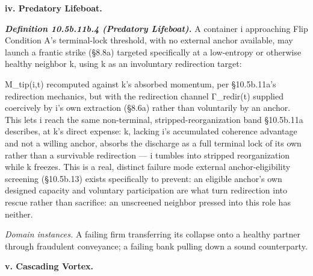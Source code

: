 \documentclass[
]{article}
\begin{document}
\textbf{iv. Predatory Lifeboat.}

\emph{\textbf{Definition 10.5b.11b.4 (Predatory Lifeboat).}} A container
i approaching Flip Condition A's terminal-lock threshold, with no
external anchor available, may launch a frantic strike (§8.8a) targeted
specifically at a low-entropy or otherwise healthy neighbor k, using k
as an involuntary redirection target:

M\_tip(i,t) recomputed against k's absorbed momentum, per §10.5b.11a's
redirection mechanics, but with the redirection channel Γ\_redir(t)
supplied coercively by i's own extraction (§8.6a) rather than
voluntarily by an anchor. This lets i reach the same non-terminal,
stripped-reorganization band §10.5b.11a describes, at k's direct
expense: k, lacking i's accumulated coherence advantage and not a
willing anchor, absorbs the discharge as a full terminal lock of its own
rather than a survivable redirection --- i tumbles into stripped
reorganization while k freezes. This is a real, distinct failure mode
external anchor-eligibility screening (§10.5b.13) exists specifically to
prevent: an eligible anchor's own designed capacity and voluntary
participation are what turn redirection into rescue rather than
sacrifice: an unscreened neighbor pressed into this role has neither.

\emph{Domain instances.} A failing firm transferring its collapse onto a
healthy partner through fraudulent conveyance; a failing bank pulling
down a sound counterparty.

\textbf{v. Cascading Vortex.}
\end{document}
